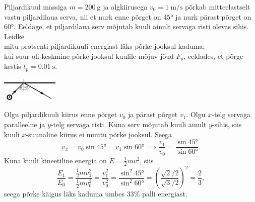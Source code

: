 
Piljardikuul massiga $m=\SI{200}{\g}$ ja algkiirusega $v_0=\SI{1}{\m\per\s}$ põrkab mitteelastselt vastu piljardilaua serva, nii et nurk enne põrget on $\ang{45}$ ja nurk pärast põrget on $\ang{60}$. Eeldage, et piljardilaua serv mõjutab kuuli ainult servaga risti olevas sihis. Leidke\\
\osa mitu protsenti piljardikuuli energiast läks põrke jooksul kaduma;\\
\osa kui suur oli keskmine põrke jooksul kuulile mõjuv jõud $F_p$, eeldades, et põrge kestis $t_p=\SI{0.01}{\s}$.
\begin{center}
  \vspace{-1em}
  \includegraphics[width=0.6\linewidth]{2024-v3g-04-yl.pdf}
  \vspace{-1em}
\end{center}



\hint

\solu
\par
\osa Olgu piljardikuuli kiirus enne põrget $v_0$ ja pärast põrget $v_1$. Olgu $x$-telg servaga paralleelne ja $y$-telg servaga risti. Kuna serv mõjutab kuuli ainult $y$-sihis, siis kuuli $x$-suunaline kiirus ei muutu põrke jooksul. Seega
\begin{equation*}
    v_x = v_0\sin\ang{45} = v_1\sin\ang{60} \implies \frac{v_1}{v_0} = \frac{\sin\ang{45}}{\sin\ang{60}}.
\end{equation*}
Kuna kuuli kineetiline energia on $E = \frac{1}{2}mv^2$, siis
\begin{equation*}
    \frac{E_1}{E_0} = \frac{\frac{1}{2}mv_1^2}{\frac{1}{2}mv_0^2} = \frac{v_1^2}{v_0^2} = \frac{\sin^2\ang{45}}{\sin^2\ang{60}} = \left(\frac{\sqrt{2}/2}{\sqrt{3}/2}\right)^2 = \frac{2}{3},
\end{equation*}
seega põrke käigus läks kaduma umbes $33\%$ palli energiast.

